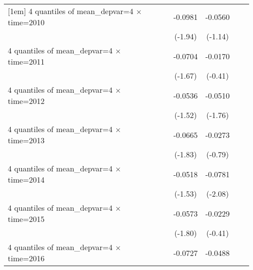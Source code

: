 \begin{table}[htbp]
\begin{tabular}{l*{6}{c}}
[1em]
4 quantiles of mean\_depvar=4 $\times$ time=2010&                     &                     &     -0.0981\sym{*}  &     -0.0560         &                     &                     \\
                    &                     &                     &     (-1.94)         &     (-1.14)         &                     &                     \\
[1em]
4 quantiles of mean\_depvar=4 $\times$ time=2011&                     &                     &     -0.0704         &     -0.0170         &                     &                     \\
                    &                     &                     &     (-1.67)         &     (-0.41)         &                     &                     \\
[1em]
4 quantiles of mean\_depvar=4 $\times$ time=2012&                     &                     &     -0.0536         &     -0.0510\sym{*}  &                     &                     \\
                    &                     &                     &     (-1.52)         &     (-1.76)         &                     &                     \\
[1em]
4 quantiles of mean\_depvar=4 $\times$ time=2013&                     &                     &     -0.0665\sym{*}  &     -0.0273         &                     &                     \\
                    &                     &                     &     (-1.83)         &     (-0.79)         &                     &                     \\
[1em]
4 quantiles of mean\_depvar=4 $\times$ time=2014&                     &                     &     -0.0518         &     -0.0781\sym{**} &                     &                     \\
                    &                     &                     &     (-1.53)         &     (-2.08)         &                     &                     \\
[1em]
4 quantiles of mean\_depvar=4 $\times$ time=2015&                     &                     &     -0.0573\sym{*}  &     -0.0229         &                     &                     \\
                    &                     &                     &     (-1.80)         &     (-0.41)         &                     &                     \\
[1em]
4 quantiles of mean\_depvar=4 $\times$ time=2016&                     &                     &     -0.0727\sym{**} &     -0.0488         &                     &                     \\

\end{tabular}
\end{table}
